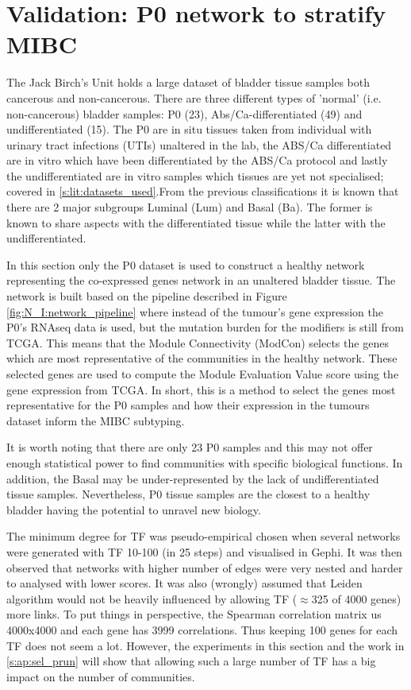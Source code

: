 

\section{Validation: P0 network to stratify MIBC} \label{s:p0}

 
The Jack Birch's Unit holds a large dataset of bladder tissue samples both cancerous and non-cancerous. There are three different types of 'normal'  (i.e. non-cancerous) bladder samples: P0 (23), Abs/Ca-differentiated (49) and undifferentiated (15). The P0 are in situ tissues taken from individual with urinary tract infections (UTIs) unaltered in the lab, the ABS/Ca differentiated are in vitro which have been differentiated by the ABS/Ca protocol and lastly the undifferentiated are in vitro samples which tissues are yet not specialised; covered in \cref{s:lit:datasets_used}.From the previous classifications \citet{Robertson2017-mg, Kamoun2020-tj} it is known that there are 2 major subgroups Luminal (Lum) and Basal (Ba). The former is known to share aspects with the differentiated tissue while the latter with the undifferentiated. 

In this section only the P0 dataset is used to construct a healthy network representing the co-expressed genes network in an unaltered bladder tissue. The network is built based on the pipeline described in Figure \ref{fig:N_I:network_pipeline} where instead of the tumour's gene expression the P0's RNAseq data is used, but the mutation burden for the modifiers is still from TCGA. This means that the Module Connectivity (ModCon) selects the genes which are most representative of the communities in the healthy network. These selected genes are used to compute the Module Evaluation Value score using the gene expression from TCGA. In short, this is a method to select the genes most representative for the P0 samples and how their expression in the tumours dataset inform the MIBC subtyping. 

It is worth noting that there are only 23 P0 samples and this may not offer enough statistical power to find communities with specific biological functions. In addition, the Basal may be under-represented by the lack of undifferentiated tissue samples. Nevertheless, P0 tissue samples are the closest to a healthy bladder having the potential to unravel new biology.

The minimum degree for TF was pseudo-empirical chosen when several networks were generated with TF 10-100 (in 25 steps) and visualised in Gephi. It was then observed that networks with higher number of edges were very nested and harder to analysed with lower scores. It was also (wrongly) assumed that Leiden algorithm would not be heavily influenced by allowing TF ($\approx$325 of 4000 genes) more links. To put things in perspective, the Spearman correlation matrix us 4000x4000 and each gene has 3999 correlations. Thus keeping 100 genes for each TF does not seem a lot. However, the experiments in this section and the work in \cref{s:ap:sel_prun} will show that allowing such a large number of TF has a big impact on the number of communities.

